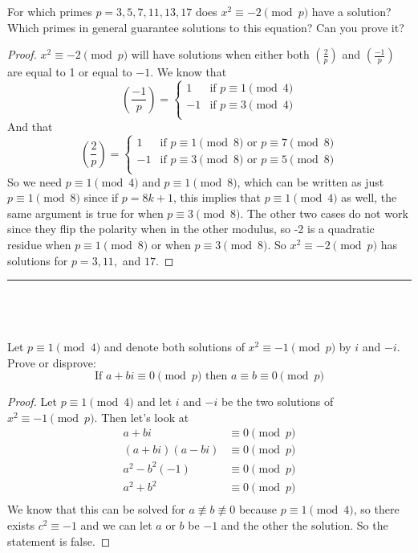 \documentclass[11pt]{article}
\newcommand{\nequiv}{\not\equiv}
\newcommand\leg[2]{\left(\frac{#1}{#2}\right)}
\newenvironment{myproblem}[1][Problem]{\begin{trivlist}
    \item[\hskip \labelsep {\bfseries #1.}]}{\end{trivlist}}
\begin{document}
\begin{myproblem}
  For which primes $p=3,5,7,11,13,17$ does $x^2\equiv -2 \pmod{p}$ have a solution?
  Which primes in general guarantee solutions to this equation? Can you prove it?
\end{myproblem}

\begin{proof}
  $x^2\equiv -2 \pmod{p}$ will have solutions when either both $\leg{2}{p}$ and $\leg{-1}{p}$ are equal to 1 or equal to $-1$. We know that
  \[
    \leg{-1}{p} =
    \begin{cases}
      1  & \text{if } p\equiv 1 \pmod{4} \\
      -1 & \text{if } p\equiv 3 \pmod{4} \\
    \end{cases}
  \]
  And that
  \[
    \leg{2}{p} =
    \begin{cases}
      1  & \text{if } p\equiv 1 \pmod{8} \text{ or }  p\equiv 7 \pmod{8} \\
      -1 & \text{if } p\equiv 3 \pmod{8} \text{ or }  p\equiv 5 \pmod{8} \\
    \end{cases}
  \]
  So we need $p\equiv 1\pmod{4}$ and $p\equiv 1 \pmod{8}$, which can be written as just $p\equiv 1 \pmod{8}$ since if $p=8k+1$, this implies that $p\equiv 1\pmod{4}$ as well, the same argument is true for when $p\equiv 3\pmod{8}$. The other two cases do not work since they flip the polarity when in the other modulus, so -2 is a quadratic residue when $p\equiv 1\pmod{8}$ or when $p\equiv 3 \pmod{8}$. So $x^2\equiv -2 \pmod{p}$ has solutions for $p=3,11,$ and $17$.
\end{proof}



\hrule
~\newline

\section{}

\begin{myproblem}
  Let $p\equiv 1\pmod{4}$ and denote both solutions of $x^2\equiv -1 \pmod{p}$ by $i$ and $-i$.
  Prove or disprove:
  \[
    \text{If } a+bi\equiv 0 \pmod{p} \text{ then } a\equiv b\equiv 0 \pmod{p}
  \]
\end{myproblem}

\begin{proof}
  Let $p\equiv 1\pmod{4}$ and let $i$ and $-i$ be the two solutions of $x^2\equiv -1\pmod{p}$. Then let's look at
  \begin{align*}
    a+bi          & \equiv 0 \pmod{p} \\
    (a+bi)(a-bi)  & \equiv 0 \pmod{p} \\
    a^2 - b^2(-1) & \equiv 0 \pmod{p} \\
    a^2 +b^2      & \equiv 0 \pmod{p} \\
  \end{align*}
  We know that this can be solved for $a\nequiv b\nequiv 0$ because $p\equiv 1 \pmod{4}$, so there exists $c^2\equiv -1$ and we can let $a$ or $b$ be $-1$ and the other the solution. So the statement is false.
\end{proof}
\end{document}
